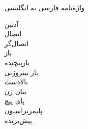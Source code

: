 
\begin{center}
\vspace{1.5cm}
\Huge{واژه‌نامه فارسی به انگلیسی}
\vspace{1.5cm}
\end{center}
آدنین                              \dotfill               {}                       \\
اتصال                              \dotfill               {}                       \\
اتصال‌گر                           \dotfill               {}                       \\

باز                                \dotfill               {}                       \\
بازپیچیده                         \dotfill               {}                     \\
باز نیتروژنی                      \dotfill               {}                       \\
بالادست                            \dotfill               {}                            \\
بیان ژن                           \dotfill               {}                       \\

پای پیچ                           \dotfill               {}                         \\
پلیمریزاسیون                      \dotfill               {}                      \\
پیش‌برنده                          \dotfill               {}                        \\

